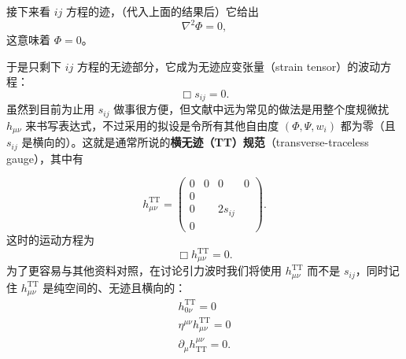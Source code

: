 接下来看 $ij$ 方程的迹，（代入上面的结果后）它给出
\begin{equation*}
\nabla^2\Phi = 0,
\tag{7.88}
\end{equation*}
这意味着 $\Phi = 0$。

于是只剩下 $ij$ 方程的无迹部分，它成为无迹应变张量（strain tensor）的波动方程：
\begin{equation*}
\Box s_{ij} = 0.
\tag{7.89}
\end{equation*}
虽然到目前为止用 $s_{ij}$ 做事很方便，但文献中远为常见的做法是用整个度规微扰 $h_{\mu\nu}$ 来书写表达式，不过采用的拟设是令所有其他自由度 $(\Phi, \Psi, w_i)$ 都为零（且 $s_{ij}$ 是横向的）。这就是通常所说的\textbf{横无迹（TT）规范}（transverse-traceless gauge），其中有


\begin{equation*}
h^{\mathrm{TT}}_{\mu\nu} =
\begin{pmatrix}
0 & 0 & 0 & 0 \\
0 & & & \\
0 & & 2s_{ij} & \\
0 & & &
\end{pmatrix}.
\tag{7.90}
\end{equation*}
这时的运动方程为
\begin{equation*}
\Box h^{\mathrm{TT}}_{\mu\nu} = 0.
\tag{7.91}
\end{equation*}
为了更容易与其他资料对照，在讨论引力波时我们将使用 $h^{\mathrm{TT}}_{\mu\nu}$ 而不是 $s_{ij}$，同时记住 $h^{\mathrm{TT}}_{\mu\nu}$ 是纯空间的、无迹且横向的：
\begin{gather*}
h^{\mathrm{TT}}_{0\nu} = 0 \\
\eta^{\mu\nu}h^{\mathrm{TT}}_{\mu\nu} = 0 \\
\partial_\mu h^{\mu\nu}_{\mathrm{TT}} = 0.
\tag{7.92}
\end{gather*}

